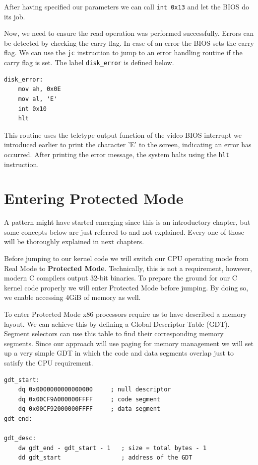 After having specified our parameters we can call \texttt{int 0x13} and let the BIOS do its job.

Now, we need to ensure the read operation was performed successfully. Errors can be detected by checking 
the carry flag. In case of an error the BIOS sets the carry flag. We can use the \texttt{jc} instruction 
to jump to an error handling routine if the carry flag is set. The label \texttt{disk\_error} is defined below.

\begin{lstlisting}[caption={Assembly to handle disk read errors}]
disk_error:
    mov ah, 0x0E
    mov al, 'E'
    int 0x10
    hlt
\end{lstlisting}

This routine uses the teletype output function of the video BIOS interrupt we introduced earlier
to print the character 'E' to the screen, indicating an error has occurred. After printing the error message,
the system halts using the \texttt{hlt} instruction.

\section{Entering Protected Mode}

A pattern might have started emerging since this is an introductory chapter, but some concepts below are just referred
to and not explained. Every one of those will be thoroughly explained in next chapters.

Before jumping to our kernel code we will switch our CPU operating mode from Real Mode to \textbf{Protected Mode}.
Technically, this is not a requirement, however, modern C compilers output 32-bit binaries. To prepare the ground
for our C kernel code properly we will enter Protected Mode before jumping. By doing so, we enable accessing 4GiB of 
memory as well.

To enter Protected Mode x86 processors require us to have described a memory layout. We can achieve this by defining
a Global Descriptor Table (GDT). Segment selectors can use this table to find their corresponding memory segments. Since 
our approach will use paging for memory management we will set up a very simple GDT in which the code and data segments
overlap just to satisfy the CPU requirement.

\begin{lstlisting}[caption={Defining a GDT}]
gdt_start:
    dq 0x0000000000000000     ; null descriptor
    dq 0x00CF9A000000FFFF     ; code segment
    dq 0x00CF92000000FFFF     ; data segment
gdt_end:

gdt_desc:
    dw gdt_end - gdt_start - 1   ; size = total bytes - 1
    dd gdt_start                 ; address of the GDT
\end{lstlisting}

